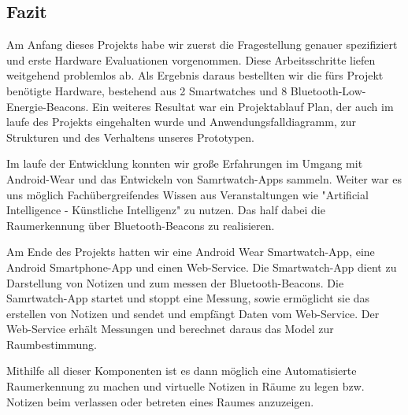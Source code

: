 \subsection{Fazit}

Am Anfang dieses Projekts habe wir zuerst die Fragestellung genauer spezifiziert und erste Hardware Evaluationen vorgenommen. Diese Arbeitsschritte liefen weitgehend problemlos ab. Als Ergebnis daraus bestellten wir die fürs Projekt benötigte Hardware, bestehend aus 2 Smartwatches und 8 Bluetooth-Low-Energie-Beacons. Ein weiteres Resultat war ein Projektablauf Plan, der auch im laufe des Projekts eingehalten wurde und Anwendungsfalldiagramm, zur Strukturen und des Verhaltens unseres Prototypen. 

Im laufe der Entwicklung konnten wir große Erfahrungen im Umgang mit Android-Wear und das Entwickeln von Samrtwatch-Apps sammeln. Weiter war es uns möglich Fachübergreifendes Wissen aus Veranstaltungen wie "Artificial Intelligence - Künstliche Intelligenz" zu nutzen. Das half dabei die Raumerkennung über Bluetooth-Beacons zu realisieren.

Am Ende des Projekts hatten wir eine Android Wear Smartwatch-App, eine Android Smartphone-App und einen Web-Service. Die Smartwatch-App dient zu Darstellung von Notizen und zum messen der Bluetooth-Beacons. Die Samrtwatch-App startet und stoppt eine Messung, sowie ermöglicht sie das erstellen von Notizen und sendet und empfängt Daten vom Web-Service. Der Web-Service erhält Messungen und berechnet daraus das Model zur Raumbestimmung.

Mithilfe all dieser Komponenten ist es dann möglich eine Automatisierte Raumerkennung zu machen und virtuelle Notizen in Räume zu legen bzw. Notizen beim verlassen oder betreten eines Raumes anzuzeigen.